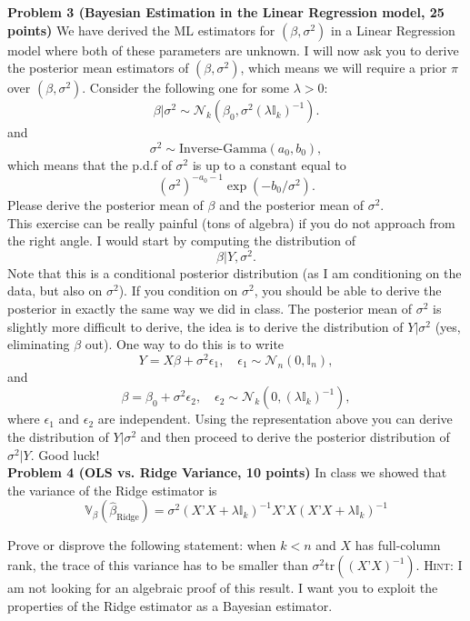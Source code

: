 \documentclass[11pt]{article} %
\begin{document}
\noindent \textbf{Problem 3 (Bayesian Estimation in the Linear Regression model, 25 points)} We have derived the ML estimators for $(\beta, \sigma^2)$ in a Linear Regression model where both of these parameters are unknown. I will now ask you to derive the posterior mean estimators of $(\beta, \sigma^2)$, which means we will require a prior $\pi$ over $(\beta, \sigma^2)$. Consider the following one for some $\lambda > 0$: 
\[ \beta | \sigma^2 \sim \mathcal{N}_k( \beta_0  , \sigma^2 (\lambda \mathbb{I}_k)^{-1} ).     \]
and
\[ \sigma^2 \sim \textrm{Inverse-Gamma} (a_0, b_0), \]
which means that the p.d.f of $\sigma^2$ is up to a constant equal to
\[ (\sigma^2)^{-a_0-1}  \exp \left ( -b_0 / \sigma^2  \right).\]
\noindent Please derive the posterior mean of $\beta$ and the posterior mean of $\sigma^2$. \\

 This exercise can be really painful (tons of algebra) if you do not approach from the right angle. I would start by computing the distribution of
\[ \beta | Y, \sigma^2.\]
Note that this is a conditional posterior distribution (as I am conditioning on the data, but also on $\sigma^2$). If you condition on $\sigma^2$, you should be able to derive the posterior in exactly the same way we did in class. The posterior mean of $\sigma^2$ is slightly more difficult to derive, the idea is to derive the distribution of $Y | \sigma^2$ (yes, eliminating $\beta$ out). One way to do this is to write
\[ Y = X\beta + \sigma^2 \epsilon_1, \quad \epsilon_1 \sim \mathcal{N}_n(0, \mathbb{I}_n), \]
and
\[ \beta = \beta_0 + \sigma^2 \epsilon_2, \quad \epsilon_2 \sim \mathcal{N}_k(0, (\lambda \mathbb{I}_k)^{-1}), \]
where $\epsilon_1$ and $\epsilon_2$ are independent. Using the representation above you can derive the distribution of $Y | \sigma^2$ and then proceed to derive the posterior distribution of $\sigma^2 | Y$.  Good luck!\\

\noindent \textbf{Problem 4 (OLS vs. Ridge Variance, 10 points)} In class we showed that the variance of the Ridge estimator is
\[ \mathbb{V}_{\beta} (\widehat{\beta}_{\textrm{Ridge}}) = \sigma^2( X’X + \lambda \mathbb{I}_k)^{-1} X’X ( X’X + \lambda \mathbb{I}_k)^{-1}  \]

\noindent Prove or disprove the following statement: when $k<n$ and $X$ has full-column rank, the trace of this variance has to be smaller than $\sigma^2 \textrm{tr}((X’X)^{-1})$. {\scshape Hint:} I am not looking for an algebraic proof of this result. I want you to exploit the properties of the Ridge estimator as a Bayesian estimator.   \\
\end{document}
